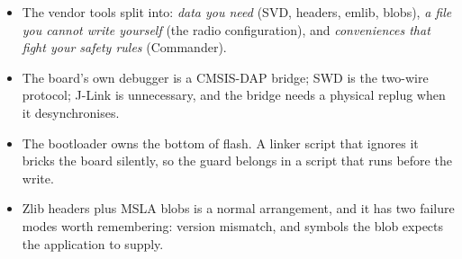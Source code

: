 \begin{itemize}
    \item The vendor tools split into: \emph{data you need} (SVD, headers, emlib, blobs), \emph{a
          file you cannot write yourself} (the radio configuration), and \emph{conveniences that
          fight your safety rules} (Commander).
    \item The board's own debugger is a CMSIS-DAP bridge; SWD is the two-wire protocol; J-Link is
          unnecessary, and the bridge needs a physical replug when it desynchronises.
    \item The bootloader owns the bottom of flash. A linker script that ignores it bricks the board
          silently, so the guard belongs in a script that runs before the write.
    \item Zlib headers plus MSLA blobs is a normal arrangement, and it has two failure modes worth
          remembering: version mismatch, and symbols the blob expects the application to supply.
\end{itemize}
